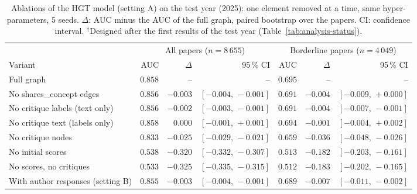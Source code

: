 \begin{table}[t]
\centering
\small
\setlength{\tabcolsep}{4pt}
\caption{Ablations of the HGT model (setting A) on the test year (2025): one element removed at a time, same hyper-parameters, 5 seeds. $\Delta$: AUC minus the AUC of the full graph, paired bootstrap over the papers. CI: confidence interval. $^{\dagger}$Designed after the first results of the test year (Table~\ref{tab:analysis-status}).}
\label{tab:ablations-delta}
\begin{tabular}{@{}lrrrrrr@{}}
\toprule
 & \multicolumn{3}{c}{All papers ($n = 8\,655$)} & \multicolumn{3}{c}{Borderline papers ($n = 4\,049$)} \\
\cmidrule(lr){2-4} \cmidrule(lr){5-7}
Variant & AUC & $\Delta$ & 95\,\% CI & AUC & $\Delta$ & 95\,\% CI \\
\midrule
Full graph & $0.858$ & -- & -- & $0.695$ & -- & -- \\
No shares\_concept edges & $0.856$ & $-0.003$ & $[-0.004,\,-0.001]$ & $0.691$ & $-0.004$ & $[-0.009,\,+0.000]$ \\
No critique labels (text only) & $0.856$ & $-0.002$ & $[-0.003,\,-0.001]$ & $0.691$ & $-0.004$ & $[-0.007,\,-0.001]$ \\
No critique text (labels only) & $0.858$ & $0.000$ & $[-0.001,\,+0.001]$ & $0.694$ & $-0.001$ & $[-0.004,\,+0.002]$ \\
No critique nodes & $0.833$ & $-0.025$ & $[-0.029,\,-0.021]$ & $0.659$ & $-0.036$ & $[-0.048,\,-0.026]$ \\
No initial scores & $0.538$ & $-0.320$ & $[-0.332,\,-0.307]$ & $0.513$ & $-0.182$ & $[-0.203,\,-0.161]$ \\
No scores, no critiques & $0.533$ & $-0.325$ & $[-0.335,\,-0.315]$ & $0.512$ & $-0.183$ & $[-0.202,\,-0.165]$ \\
With author responses (setting B) & $0.855$ & $-0.003$ & $[-0.004,\,-0.001]$ & $0.689$ & $-0.007$ & $[-0.011,\,-0.002]$ \\
\bottomrule
\end{tabular}
\end{table}

